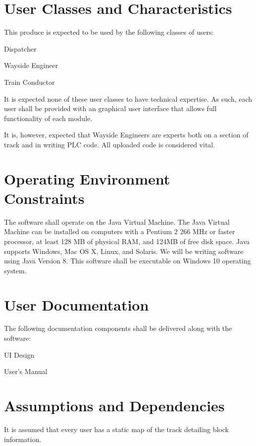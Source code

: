 \documentclass{scrreprt}
\begin{document}
\section{User Classes and Characteristics}
This produce is expected to be used by the following classes of users:
\begin{numonly}
    \item Dispatcher
    \item Wayside Engineer
    \item Train Conductor
\end{numonly}

It is expected none of these user classes to have technical expertise. As such,
each user shall be provided with an graphical user interface that allows full
functionality of each module.

It is, however, expected that Wayside Engineers are experts both on a section
of track and in writing PLC code. All uploaded code is considered vital.

\section{Operating Environment Constraints}
The software shall operate on the Java Virtual Machine. The Java Virtual Machine
can be installed on computers with a Pentium 2 266 MHz or faster processor, at
least 128 MB of physical RAM, and 124MB of free disk space. Java supports Windows,
Mac OS X, Linux, and Solaris. We will be writing software using Java Version 8.
This software shall be executable on Windows 10 operating system.

\section{User Documentation}

The following documentation components shall be delivered along with the software:
\begin{numonly}
    \item UI Design
    \item User's Manual
\end{numonly}

\section{Assumptions and Dependencies}
It is assumed that every user has a static map of the track detailing block information.
\end{document}
